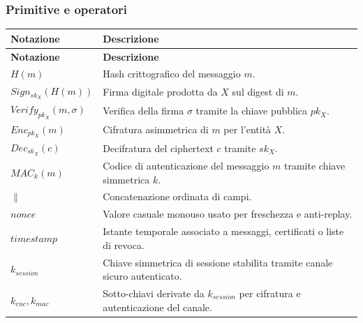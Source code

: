\documentclass[a4paper,12pt]{article}
\begin{document}
\subsubsection{Primitive e operatori}

\begin{longtable}{|>{\raggedright\arraybackslash}p{}|>{\raggedright\arraybackslash}p{}|}
	\hline
	\rowcolor{HeaderBlue}\textbf{Notazione} & \textbf{Descrizione}                                                              \\
	\hline
	\endfirsthead
	\hline
	\rowcolor{HeaderBlue}\textbf{Notazione} & \textbf{Descrizione}                                                              \\
	\hline
	\endhead
	$H(m)$                                  & Hash crittografico del messaggio $m$.                                             \\
	\hline
	$Sign_{sk_X}(H(m))$                     & Firma digitale prodotta da $X$ sul digest di $m$.                                 \\
	\hline
	$Verify_{pk_X}(m, \sigma)$              & Verifica della firma $\sigma$ tramite la chiave pubblica $pk_X$.                  \\
	\hline
	$Enc_{pk_X}(m)$                         & Cifratura asimmetrica di $m$ per l'entità $X$.                                    \\
	\hline
	$Dec_{sk_X}(c)$                         & Decifratura del ciphertext $c$ tramite $sk_X$.                                    \\
	\hline
	$MAC_k(m)$                              & Codice di autenticazione del messaggio $m$ tramite chiave simmetrica $k$.         \\
	\hline
	$\parallel$                             & Concatenazione ordinata di campi.                                                 \\
	\hline
	$nonce$                                 & Valore casuale monouso usato per freschezza e anti-replay.                        \\
	\hline
	$timestamp$                             & Istante temporale associato a messaggi, certificati o liste di revoca.            \\
	\hline
	$k_{session}$                           & Chiave simmetrica di sessione stabilita tramite canale sicuro autenticato.        \\
	\hline
	$k_{enc}, k_{mac}$                      & Sotto-chiavi derivate da $k_{session}$ per cifratura e autenticazione del canale. \\
	\hline
\end{longtable}
\end{document}
